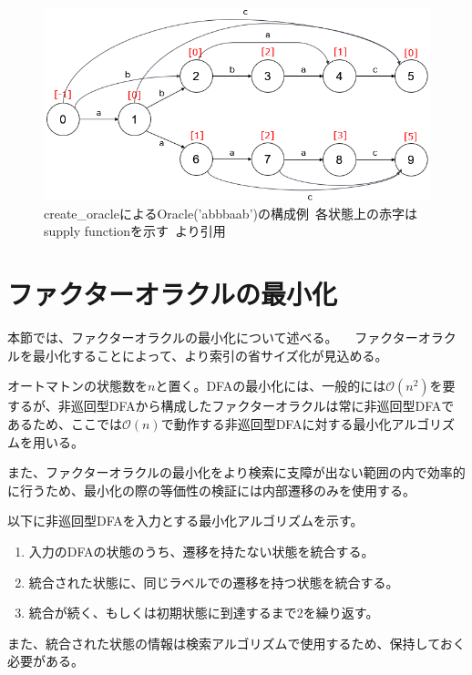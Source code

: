 \documentclass[11pt,a4paper]{jreport}
\begin{document}
  \begin{figure}[htbp]
    \centering
    \includegraphics[width=15cm]{mfo.png}
    \caption{create\_oracleによるOracle('abbbaab')の構成例\ 各状態上の赤字はsupply functionを示す\ \cite{allauzen}より引用}
  \end{figure}

  \section{ファクターオラクルの最小化}
  本節では、ファクターオラクルの最小化について述べる。
　ファクターオラクルを最小化することによって、より索引の省サイズ化が見込める。

  オートマトンの状態数を$n$と置く。DFAの最小化には、一般的には$\mathcal{O}(n^2)$を要するが、非巡回型DFAから構成したファクターオラクルは常に非巡回型DFAであるため、ここでは$\mathcal{O}(n)$で動作する非巡回型DFAに対する最小化アルゴリズムを用いる。

  また、ファクターオラクルの最小化をより検索に支障が出ない範囲の内で効率的に行うため、最小化の際の等価性の検証には内部遷移のみを使用する。

  以下に非巡回型DFAを入力とする最小化アルゴリズムを示す。
  \begin{enumerate}
    \item 入力のDFAの状態のうち、遷移を持たない状態を統合する。
    \item 統合された状態に、同じラベルでの遷移を持つ状態を統合する。
    \item 統合が続く、もしくは初期状態に到達するまで2を繰り返す。
  \end{enumerate}

  また、統合された状態の情報は検索アルゴリズムで使用するため、保持しておく必要がある。
\end{document}
